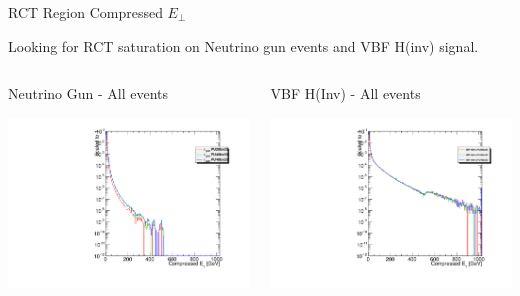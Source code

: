 \documentclass[8pt]{beamer}
\begin{document}
\begin{frame}{RCT Region Compressed $E_{\perp}$}

Looking for RCT saturation on Neutrino gun events and VBF H(inv) signal.

\begin{columns}
 
\begin{block}{Neutrino Gun - All events}
\centering

\includegraphics[width=\linewidth]{fig/RCTRegion_Val_NG.pdf}

\end{block}

\begin{block}{VBF H(Inv) - All events}
\centering

\includegraphics[width=\linewidth]{fig/RCTRegion_Val_Sig.pdf}


\end{block}
\end{columns}
\end{frame}
\end{document}
